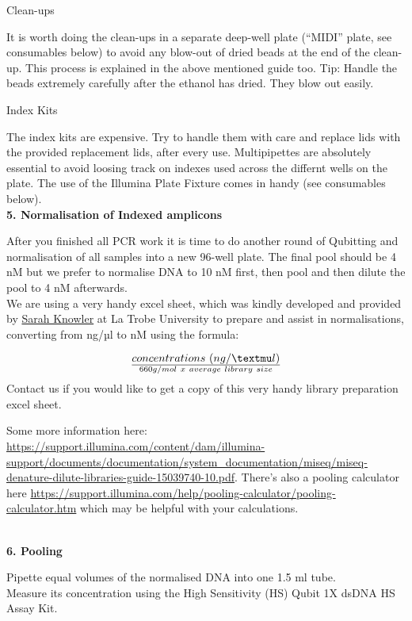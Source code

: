 \documentclass[
]{book}
\begin{document}
Clean-ups

It is worth doing the clean-ups in a separate deep-well plate (``MIDI'' plate, see consumables below) to avoid any blow-out of dried beads at the end of the clean-up. This process is explained in the above mentioned guide too. Tip: Handle the beads extremely carefully after the ethanol has dried. They blow out easily.

Index Kits

The index kits are expensive. Try to handle them with care and replace lids with the provided replacement lids, after every use. Multipipettes are absolutely essential to avoid loosing track on indexes used across the differnt wells on the plate. The use of the Illumina Plate Fixture comes in handy (see consumables below).\\

\textbf{5. Normalisation of Indexed amplicons}

After you finished all PCR work it is time to do another round of Qubitting and normalisation of all samples into a new 96-well plate. The final pool should be 4 nM but we prefer to normalise DNA to 10 nM first, then pool and then dilute the pool to 4 nM afterwards.\\
We are using a very handy excel sheet, which was kindly developed and provided by \href{https://scholars.latrobe.edu.au/sknowler}{Sarah Knowler} at La Trobe University to prepare and assist in normalisations, converting from ng/µl to nM using the formula:

\[ concentrations~(ng/µl)  \over 660 g/mol~x~average~library~size\]
Contact us if you would like to get a copy of this very handy library preparation excel sheet.

Some more information here: \url{https://support.illumina.com/content/dam/illumina-support/documents/documentation/system_documentation/miseq/miseq-denature-dilute-libraries-guide-15039740-10.pdf}. There's also a pooling calculator here \url{https://support.illumina.com/help/pooling-calculator/pooling-calculator.htm} which may be helpful with your calculations.\\
\strut \\

\textbf{6. Pooling}

Pipette equal volumes of the normalised DNA into one 1.5 ml tube.\\
Measure its concentration using the High Sensitivity (HS) Qubit 1X dsDNA HS Assay Kit.\\
\end{document}
